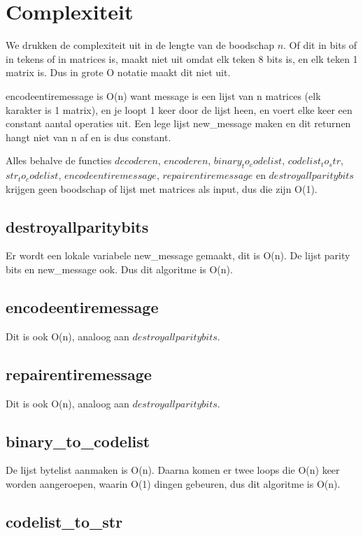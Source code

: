 \documentclass[a4paper]{article}
\begin{document}
\section{Complexiteit}
We drukken de complexiteit uit in de lengte van de boodschap \(n\). Of dit in bits of in tekens of in matrices is, maakt niet uit omdat elk teken 8 bits is, en elk teken 1 matrix is. Dus in grote O notatie maakt dit niet uit.

encodeentiremessage is O(n) want message is een lijst van n matrices (elk karakter is 1 matrix), en je loopt 1 keer door de lijst heen, en voert elke keer een constant aantal operaties uit. Een lege lijst new\_message maken en dit returnen hangt niet van n af en is dus constant.

Alles behalve de functies $decoderen$, $encoderen$, $binary_to_codelist$, $codelist_to_str$, $str_to_codelist$, $encodeentiremessage$, $repairentiremessage$ en $destroyallparitybits$ krijgen geen boodschap of lijst met matrices als input, dus die zijn O(1). 

\subsection{destroyallparitybits}

Er wordt een lokale variabele new\_message gemaakt, dit is O(n). De lijst parity bits en new\_message ook. Dus dit algoritme is O(n).

\subsection{encodeentiremessage}

Dit is ook O(n), analoog aan $destroyallparitybits$.

\subsection{repairentiremessage}

Dit is ook O(n), analoog aan $destroyallparitybits$.

\subsection{binary\_to\_codelist}

De lijst bytelist aanmaken is O(n). Daarna komen er twee loops die O(n) keer worden aangeroepen, waarin O(1) dingen gebeuren, dus dit algoritme is O(n).

\subsection{codelist\_to\_str}
\end{document}
